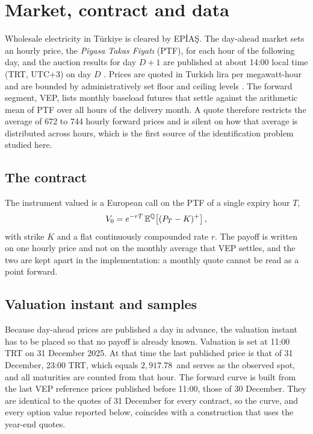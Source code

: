 \section{Market, contract and data}
\label{sec:market}

Wholesale electricity in Türkiye is cleared by EPİAŞ. The day-ahead market
sets an hourly price, the \emph{Piyasa Takas Fiyatı} (PTF), for each hour of
the following day, and the auction results for day $D+1$ are published at
about 14:00 local time (TRT, UTC+3) on day $D$ \citep{EPIAS2025}. Prices are
quoted in Turkish lira per megawatt-hour and are bounded by administratively
set floor and ceiling levels \citep{EPDK2024}. The forward segment, VEP, lists
monthly baseload futures that settle against the arithmetic mean of PTF over
all hours of the delivery month. A quote therefore restricts the average of
672 to 744 hourly forward prices and is silent on how that average is
distributed across hours, which is the first source of the identification
problem studied here.

\subsection{The contract}

The instrument valued is a European call on the PTF of a single expiry hour
$T$,
\begin{equation}
  V_0 = e^{-rT}\,\mathbb{E}^{\mathbb{Q}}\!\left[(P_T-K)^{+}\right],
  \label{eq:payoff}
\end{equation}
with strike $K$ and a flat continuously compounded rate $r$. The payoff is
written on one hourly price and not on the monthly average that VEP settles,
and the two are kept apart in the implementation: a monthly quote cannot be
read as a point forward.

\subsection{Valuation instant and samples}
\label{sec:timing}

Because day-ahead prices are published a day in advance, the valuation instant
has to be placed so that no payoff is already known. Valuation is set at 11:00
TRT on 31 December 2025. At that time the last published price is that of
31 December, 23:00 TRT, which equals $2{,}917.78$\,\TRY{} and serves as the
observed spot, and all maturities are counted from that hour. The forward
curve is built from the last VEP reference prices published before 11:00, those
of 30 December. They are identical to the quotes of 31 December for every
contract, so the curve, and every option value reported below, coincides with
a construction that uses the year-end quotes.

